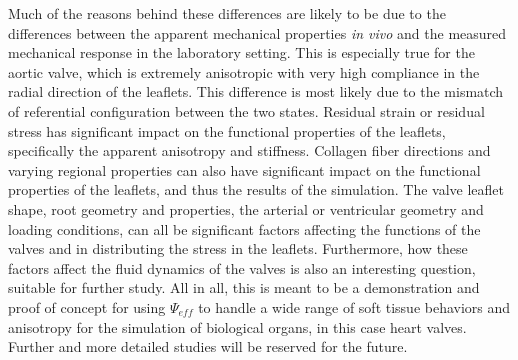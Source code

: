     Much of the reasons behind these differences are likely to be due to the differences between the apparent mechanical properties \textit{in vivo} and the measured mechanical response in the laboratory setting. This is especially true for the aortic valve, which is extremely anisotropic with very high compliance in the radial direction of the leaflets. This difference is most likely due to the mismatch of referential configuration between the two states. Residual strain or residual stress has significant impact on the functional properties of the leaflets, specifically the apparent anisotropy and stiffness. Collagen fiber directions and varying regional properties can also have significant impact on the functional properties of the leaflets, and thus the results of the simulation. The valve leaflet shape, root geometry and properties, the arterial or ventricular geometry and loading conditions, can all be significant factors affecting the functions of the valves and in distributing the stress in the leaflets. Furthermore, how these factors affect the fluid dynamics of the valves is also an interesting question, suitable for further study. All in all, this is meant to be a demonstration and proof of concept for using $\Psi_{eff}$ to handle a wide range of soft tissue behaviors and anisotropy for the simulation of biological organs, in this case heart valves. Further and more detailed studies will be reserved for the future.  
  

    
    

